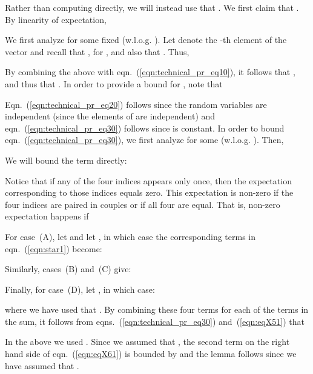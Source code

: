 \documentclass[11pt]{article}
\begin{document}
Rather than computing  directly, we will instead use that . We first claim that . By linearity of expectation,

We first analyze
 for some fixed  (w.l.o.g. ). Let  denote the -th element of the vector  and recall that ,  for ,
and also that .
Thus,

By combining the above with eqn.~(\ref{eqn:technical_pr_eq10}), it follows that
, and thus that .
In order to provide a bound for , note that

Eqn.~(\ref{eqn:technical_pr_eq20}) follows since the  random variables
 are independent (since the elements
of  are independent) and eqn.~(\ref{eqn:technical_pr_eq30})
follows since  is constant.
In order to bound eqn.~(\ref{eqn:technical_pr_eq30}), we first analyze
 for some  (w.l.o.g. ).
Then,

We will bound the  term directly:

Notice that if any of the four indices  appears only once,
then the expectation  corresponding
to those indices equals zero.
This expectation is non-zero if the four indices are paired in couples or
if all four are equal.
That is, non-zero expectation happens if

For case~(A), let  and let , in which case
the corresponding terms in eqn.~(\ref{eqn:star1}) become:

Similarly, cases~(B) and~(C) give:

Finally, for case~(D), let , in which case:

where we have used that .
By combining these four terms for each of the  terms in the sum, it follows
from eqns.~(\ref{eqn:technical_pr_eq30}) and~(\ref{eqn:eqX51}) that

In the above we used .
Since we assumed that , the second term on the right
hand side of eqn.~(\ref{eqn:eqX61}) is bounded by
 and the lemma follows since we have
assumed that .
\end{document}
